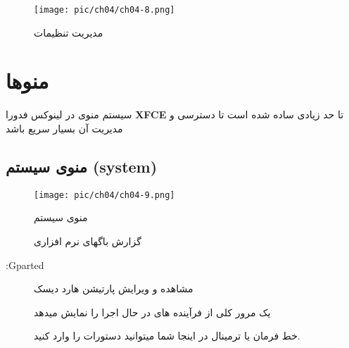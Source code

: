 \begin{figure}[H]%
	\caption{مدیریت تنظیمات}
	\begin{center}
		\texttt{[image: pic/ch04/ch04-8.png]}
	\end{center}
	\label{pic-24}
\end{figure}
\section{منوها}\label{se-38}
سیستم منوی در لینوکس فدورا 
\textbf{XFCE}
تا حد زیادی ساده شده است تا دسترسی و مدیریت آن بسیار سریع باشد
\subsection{منوی سیستم (system)}\label{se-381}
\begin{figure}[H]%
	\caption{منوی سیستم}
	\begin{center}
		\texttt{[image: pic/ch04/ch04-9.png]}
	\end{center}
	\label{pic-30}
\end{figure}
\begin{description}
	\item[] گزارش باگهای نرم افزاری 
	\item[:Gparted] مشاهده و ویرایش پارتیشن هارد دیسک 
	\item[] یک مرور کلی از فرآینده های در حال اجرا را نمایش میدهد
		\item[] خط فرمان یا ترمینال در اینجا شما میتوانید دستورات را وارد کنید.
\end{description}
